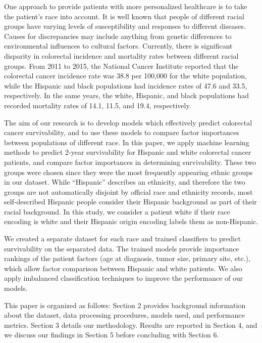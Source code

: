 \documentclass[review]{elsarticle}
\begin{document}
One approach to provide patients with more personalized healthcare is to take the patient’s race into account. It is well known that people of different racial groups have varying levels of susceptibility and responses to different diseases. Causes for discrepancies may include anything from genetic differences to environmental influences to cultural factors. Currently, there is significant disparity in colorectal incidence and mortality rates between different racial groups. From 2011 to 2015, the National Cancer Institute reported that the colorectal cancer incidence rate was 38.8 per 100,000 for the white population, while the Hispanic and black populations had incidence rates of 47.6 and 33.5, respectively. In the same years, the white, Hispanic, and black populations had recorded mortality rates of 14.1, 11.5, and 19.4, respectively\cite{race-mortality}.

The aim of our research is to develop models which effectively predict colorectal cancer survivability, and to use these models to compare factor importances between populations of different race. In this paper, we apply machine learning methods to predict 2-year survivability for Hispanic and white colorectal cancer patients, and compare factor importances in determining survivability. These two groups were chosen since they were the most frequently appearing ethnic groups in our dataset. While “Hispanic” describes an ethnicity, and therefore the two groups are not automatically disjoint by official race and ethnicity records, most self-described Hispanic people consider their Hispanic background as part of their racial background\cite{hispanic_origin}. In this study, we consider a patient white if their race encoding is white and their Hispanic origin encoding labels them as non-Hispanic.

We created a separate dataset for each race and trained classifiers to predict survivability on the separated data. The trained models provide importance rankings of the patient factors (age at diagnosis, tumor size, primary site, etc.), which allow factor comparison between Hispanic and white patients. We also apply imbalanced classification techniques to improve the performance of our models. 

This paper is organized as follows: Section 2 provides background information about the dataset, data processing procedures, models used, and performance metrics. Section 3 details our methodology. Results are reported in Section 4, and we discuss our findings in Section 5 before concluding with Section 6.
\end{document}

